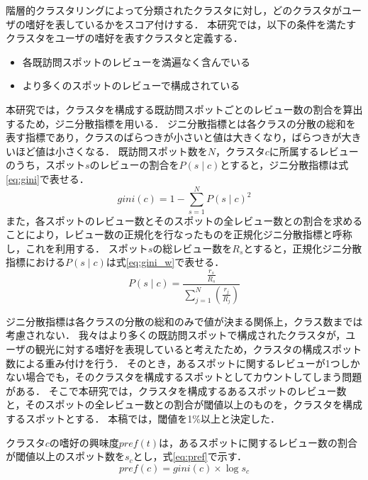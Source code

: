 \documentclass{deimj}
\begin{document}
階層的クラスタリングによって分類されたクラスタに対し，どのクラスタがユーザの嗜好を表しているかをスコア付けする．
本研究では，以下の条件を満たすクラスタをユーザの嗜好を表すクラスタと定義する．
\begin{itemize}
 \item 各既訪問スポットのレビューを満遍なく含んでいる
 \item より多くのスポットのレビューで構成されている
\end{itemize}

本研究では，クラスタを構成する既訪問スポットごとのレビュー数の割合を算出するため，ジニ分散指標を用いる．
ジニ分散指標とは各クラスの分散の総和を表す指標であり，クラスのばらつきが小さいと値は大きくなり，ばらつきが大きいほど値は小さくなる．
既訪問スポット数を$N$，クラスタ$c$に所属するレビューのうち，スポット$s$のレビューの割合を$P(s \mid c)$とすると，ジニ分散指標は式\ref{eq:gini}で表せる．
\begin{equation}
    gini(c)=1-\sum ^{N}_{s=1} P(s \mid c) ^{2}
    \label{eq:gini}
\end{equation}
また，各スポットのレビュー数とそのスポットの全レビュー数との割合を求めることにより，レビュー数の正規化を行なったものを正規化ジニ分散指標と呼称し，これを利用する．
スポット$s$の総レビュー数を$R_s$とすると，正規化ジニ分散指標における$P(s \mid c)$は式\ref{eq:gini_w}で表せる．
\begin{equation}
    P(s \mid c)=\frac {\frac{r_s}{R_s}}{\sum ^{N}_{j=1}\left( \frac {r_j}{R_j}\right)}
    \label{eq:gini_w}
\end{equation}

ジニ分散指標は各クラスの分散の総和のみで値が決まる関係上，クラス数までは考慮されない．
我々はより多くの既訪問スポットで構成されたクラスタが，ユーザの観光に対する嗜好を表現していると考えたため，クラスタの構成スポット数による重み付けを行う．
そのとき，あるスポットに関するレビューが1つしかない場合でも，そのクラスタを構成するスポットとしてカウントしてしまう問題がある．
そこで本研究では，クラスタを構成するあるスポットのレビュー数と，そのスポットの全レビュー数との割合が閾値以上のものを，クラスタを構成するスポットとする．
本稿では，閾値を1\%以上と決定した．

クラスタ$c$の嗜好の興味度$pref(t)$は，あるスポットに関するレビュー数の割合が閾値以上のスポット数を$s_c$とし，式\ref{eq:pref}で示す．
\begin{equation}
    pref(c)=gini(c) \times\log s_c
    \label{eq:pref}
\end{equation}
\end{document}
